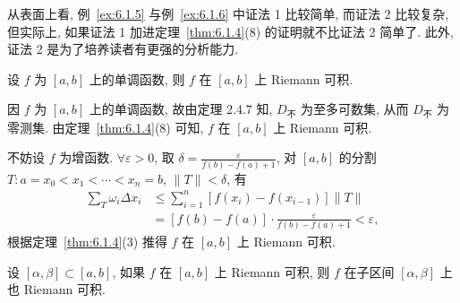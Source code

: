\begin{figure}[htbp]
\centering
{}
\caption{}\label{fig:6.1.6}
\end{figure}

从表面上看, 例~\ref{ex:6.1.5} 与例~\ref{ex:6.1.6} 中证法 1 比较简单, 而证法 2 比较复杂, 但实际上, 如果证法 1 加进定理~\ref{thm:6.1.4}(8) 的证明就不比证法 2 简单了. 此外, 证法 2 是为了培养读者有更强的分析能力.

\begin{example}\label{ex:6.1.7}
设 $f$ 为 $[a,b]$ 上的单调函数, 则 $f$ 在 $[a,b]$ 上 Riemann 可积.
\end{example}

\begin{solution}[证法 1]
因 $f$ 为 $[a,b]$ 上的单调函数, 故由定理 2.4.7 知, $D_{\text{不}}$ 为至多可数集, 从而 $D_{\text{不}}$ 为零测集. 由定理~\ref{thm:6.1.4}(8) 可知, $f$ 在 $[a,b]$ 上 Riemann 可积.
\end{solution}

\begin{solution}[证法 2]
不妨设 $f$ 为增函数. $\forall\varepsilon>0$, 取 $\delta=\frac{\varepsilon}{f(b)-f(a)+1}$, 对 $[a,b]$ 的分割 $T:a=x_{0}<x_{1}<\cdots<x_{n}=b$, $\|T\|<\delta$, 有
\begin{align*}
\sum_{T}\omega_{i}\Delta x_{i}&\leqslant\sum_{i=1}^{n}\left[f(x_{i})-f(x_{i-1})\right]\|T\|\\
&=\left[f(b)-f(a)\right]\cdot\frac{\varepsilon}{f(b)-f(a)+1}<\varepsilon,
\end{align*}
根据定理~\ref{thm:6.1.4}(3) 推得 $f$ 在 $[a,b]$ 上 Riemann 可积.
\end{solution}

\begin{example}\label{ex:6.1.8}
设 $[\alpha,\beta]\subset[a,b]$, 如果 $f$ 在 $[a,b]$ 上 Riemann 可积, 则 $f$ 在子区间 $[\alpha,\beta]$ 上也 Riemann 可积.
\end{example}

